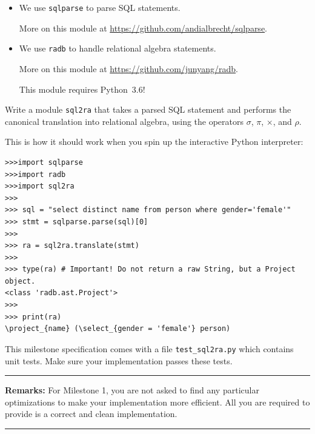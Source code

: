 \documentclass[12pt]{exam}
\begin{document}
\begin{itemize}
    \item 
We use \verb!sqlparse! to parse SQL statements.

More on this module at 
\url{https://github.com/andialbrecht/sqlparse}. 

\item
We use \verb!radb! to handle relational algebra statements. 

More on this module at
\url{https://github.com/junyang/radb}. 

This module requires Python~3.6!

\end{itemize}

\noindent
Write a module \verb!sql2ra! that takes a parsed SQL statement and performs the canonical translation into relational algebra, using the operators $\sigma$, $\pi$, $\times$, and $\rho$.

\newpage
\noindent
This is how it should work when you spin up the interactive Python interpreter:

\begin{Verbatim}[frame=single]
>>>import sqlparse
>>>import radb
>>>import sql2ra
>>>
>>> sql = "select distinct name from person where gender='female'"
>>> stmt = sqlparse.parse(sql)[0]
>>>
>>> ra = sql2ra.translate(stmt)
>>>
>>> type(ra) # Important! Do not return a raw String, but a Project object.
<class 'radb.ast.Project'>
>>>
>>> print(ra)
\project_{name} (\select_{gender = 'female'} person)
\end{Verbatim}

\noindent
This milestone specification comes with a file \verb!test_sql2ra.py! which contains unit tests. Make sure your implementation passes these tests.


\bigskip
\noindent
\rule{\linewidth}{0.5mm}


{\bf Remarks:}
For Milestone 1, you are not asked to find any particular optimizations to make your implementation more efficient. All you are required to provide is a correct and clean implementation.

\noindent
\rule{\linewidth}{0.5mm}
\end{document}
